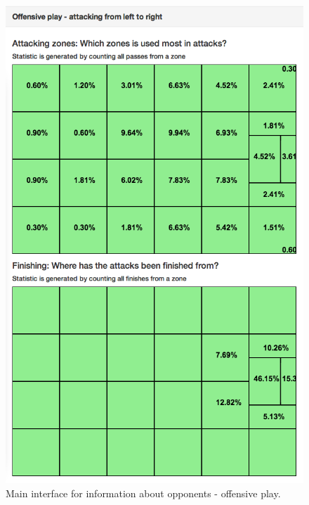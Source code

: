 \begin{figure}[ht!]
\centering
\includegraphics[width=1\textwidth]{images/general/team_analysis2.png}
\caption{Main interface for information about opponents - offensive play.}
\label{fig:team_analysis2}
\end{figure}


